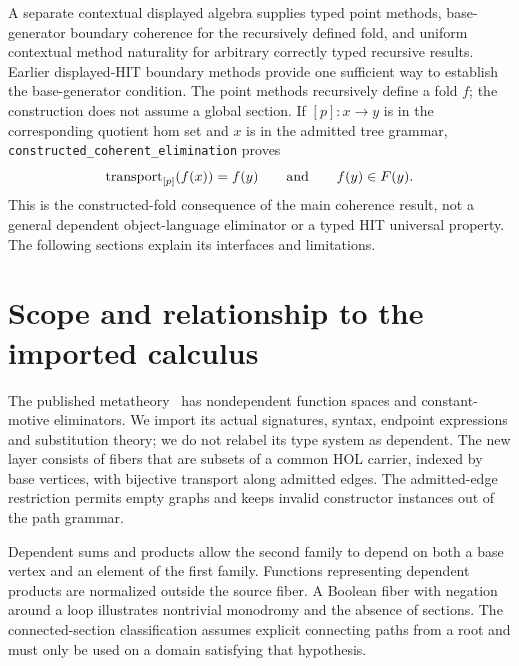 \documentclass[11pt,a4paper]{article}
\begin{document}
A separate contextual displayed algebra supplies typed point methods,
base-generator boundary coherence for the recursively defined fold, and
uniform contextual method naturality for arbitrary correctly typed recursive
results. Earlier displayed-HIT boundary methods provide one sufficient way
to establish the base-generator condition. The point methods recursively
define a fold \(f\); the construction does not assume a global section. If \([p]:x\longrightarrow y\)
is in the corresponding quotient hom set and \(x\) is in the admitted tree
grammar, \texttt{constructed\_coherent\_elimination} proves
\[
 \operatorname{transport}_{[p]}(f(x))=f(y)
 \qquad\hbox{and}\qquad f(y)\in F(y).
\]
This is the constructed-fold consequence of the main coherence result, not
a general dependent object-language eliminator or a typed HIT universal
property. The following sections explain its interfaces and limitations.

\section{Scope and relationship to the imported calculus}
The published metatheory~\cite{HITMetatheory} has nondependent function spaces
and constant-motive eliminators. We import its actual signatures, syntax,
endpoint expressions and substitution theory; we do not relabel its type
system as dependent. The new layer consists of fibers that are subsets of a
common HOL carrier, indexed by base vertices, with bijective transport along
admitted edges. The admitted-edge restriction permits empty graphs and keeps
invalid constructor instances out of the path grammar.

Dependent sums and products allow the second family to depend on both a base
vertex and an element of the first family. Functions representing dependent
products are normalized outside the source fiber. A Boolean fiber with
negation around a loop illustrates nontrivial monodromy and the absence of
sections. The connected-section classification assumes explicit connecting
paths from a root and must only be used on a domain satisfying that hypothesis.
\end{document}
